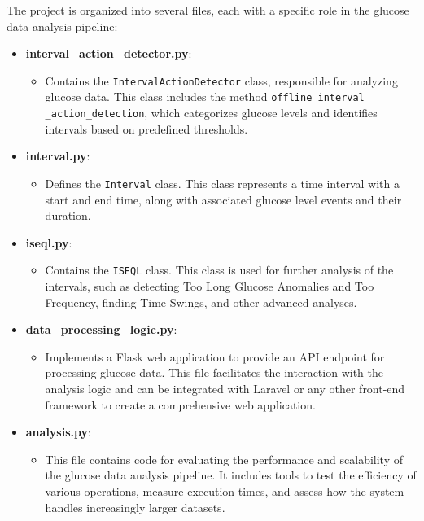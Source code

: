 \documentclass{article}
\begin{document}
The project is organized into several files, each with a specific role in the glucose data analysis pipeline:
\pagebreak
\begin{itemize}
    \item \textbf{interval\_action\_detector.py}:
    \begin{itemize}
        \item Contains the \texttt{IntervalActionDetector} class, responsible for analyzing glucose data. This class includes the method \texttt{offline\_interval
        \_action\_detection}, which categorizes glucose levels and identifies intervals based on predefined thresholds.
    \end{itemize}
    
    \item \textbf{interval.py}:
    \begin{itemize}
        \item Defines the \texttt{Interval} class. This class represents a time interval with a start and end time, along with associated glucose level events and their duration.
    \end{itemize}
    
    \item \textbf{iseql.py}:
    \begin{itemize}
        \item Contains the \texttt{ISEQL} class. This class is used for further analysis of the intervals, such as detecting Too Long Glucose Anomalies and Too Frequency, finding Time Swings, and other advanced analyses.
    \end{itemize}
    
    \item \textbf{data\_processing\_logic.py}:
    \begin{itemize}
        \item Implements a Flask web application to provide an API endpoint for processing glucose data. This file facilitates the interaction with the analysis logic and can be integrated with Laravel or any other front-end framework to create a comprehensive web application.
    \end{itemize}
    
    \item \textbf{analysis.py}:
    \begin{itemize}
        \item This file contains code for evaluating the performance and scalability of the glucose data analysis pipeline. It includes tools to test the efficiency of various operations, measure execution times, and assess how the system handles increasingly larger datasets.
    \end{itemize}
\end{itemize}
\end{document}
